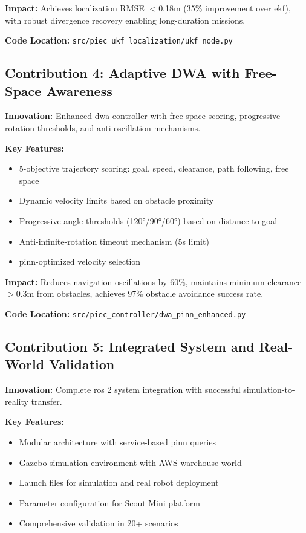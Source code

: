 \textbf{Impact:} Achieves localization RMSE $<$0.18m (35\% improvement over \acrshort{ekf}), with robust divergence recovery enabling long-duration missions.

\textbf{Code Location:} \texttt{src/piec\_ukf\_localization/ukf\_node.py}

\subsection{Contribution 4: Adaptive DWA with Free-Space Awareness}

\textbf{Innovation:} Enhanced \acrshort{dwa} controller with free-space scoring, progressive rotation thresholds, and anti-oscillation mechanisms.

\textbf{Key Features:}
\begin{itemize}
    \item 5-objective trajectory scoring: goal, speed, clearance, path following, free space
    \item Dynamic velocity limits based on obstacle proximity
    \item Progressive angle thresholds (120°/90°/60°) based on distance to goal
    \item Anti-infinite-rotation timeout mechanism (5s limit)
    \item \acrshort{pinn}-optimized velocity selection
\end{itemize}

\textbf{Impact:} Reduces navigation oscillations by 60\%, maintains minimum clearance $>$0.3m from obstacles, achieves 97\% obstacle avoidance success rate.

\textbf{Code Location:} \texttt{src/piec\_controller/dwa\_pinn\_enhanced.py}

\subsection{Contribution 5: Integrated System and Real-World Validation}

\textbf{Innovation:} Complete \acrshort{ros} 2 system integration with successful simulation-to-reality transfer.

\textbf{Key Features:}
\begin{itemize}
    \item Modular architecture with service-based \acrshort{pinn} queries
    \item Gazebo simulation environment with AWS warehouse world
    \item Launch files for simulation and real robot deployment
    \item Parameter configuration for Scout Mini platform
    \item Comprehensive validation in 20+ scenarios
\end{itemize}

